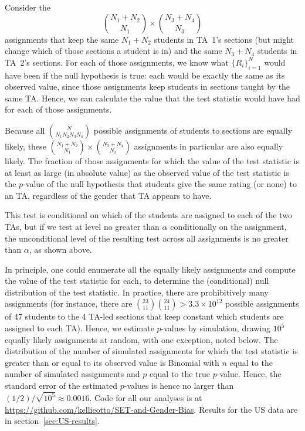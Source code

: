 \documentclass[12pt]{article}
\newcommand{\beq}{\begin{equation}}
\newcommand{\eeq}{\end{equation}}
\begin{document}
Consider the
\beq
  {{N_1 + N_2} \choose {N_1}} \times {{N_3+N_4} \choose {N_3}}
\eeq
assignments that keep the same $N_1 + N_2$ students in TA~1's
sections (but might change which of those sections a student is in) 
and the same $N_3 + N_4$ students in TA~2's sections.
For each of those assignments, we know what $\{R_i\}_{i=1}^N$ would
have been if the null hypothesis is true: each would be exactly the same
as its observed value, since those
assignments keep students in sections taught by the same TA.
Hence, we can calculate the value that the test statistic would have had for each
of those assignments.

Because all ${N}\choose{N_1 N_2 N_3 N_4}$ possible assignments of students
to sections are equally likely, these 
${{N_1 + N_2} \choose {N_1}} \times {{N_3+N_4} \choose {N_3}}$ 
assignments in particular are also equally likely.
The fraction of those assignments for which the value of the test statistic
is at least as large (in absolute value) as the observed value of the test statistic
is the $p$-value of the null hypothesis that students give the same rating (or none) to
an TA, regardless of the gender that TA appears to have.

This test is conditional on which of the students are assigned to each of the two 
TAs, but if we test at level no greater than $\alpha$ conditionally on the
assignment, the unconditional level of the resulting test across all assignments is no 
greater than $\alpha$, as shown above.

In principle, one could enumerate all the equally likely assignments and compute the value
of the test statistic for each, to determine the (conditional) null distribution of the test
statistic.
In practice, there are prohibitively many assignments
(for instance, there are ${{23}\choose{11}}{{24}\choose{11}} > 3.3\times 10^{12}$ 
possible assignments
of 47 students to the 4 TA-led sections that keep constant which
students are assigned to each TA).
Hence, we estimate $p$-values by simulation, drawing $10^5$ equally likely assignments
at random, with one exception, noted below.
The distribution of the number of simulated assignments for which the test statistic
is greater than or equal to its observed value is Binomial with $n$ equal to the number of
simulated assignments and $p$ equal to the true $p$-value.
Hence, the standard error of the estimated $p$-values is hence no larger than 
$(1/2)/ \sqrt{10^5}
\approx 0.0016$.
Code for all our analyses is at \url{https://github.com/kellieotto/SET-and-Gender-Bias}.
Results for the US data are in section~\ref{sec:US-results}.
\end{document}
